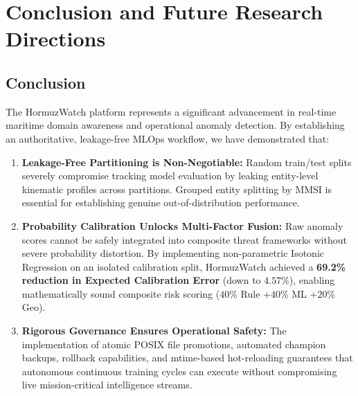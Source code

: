 \section{Conclusion and Future Research Directions}
\label{sec:conclusion}

\subsection{Conclusion}
The HormuzWatch platform represents a significant advancement in real-time maritime domain awareness and operational anomaly detection. By establishing an authoritative, leakage-free MLOps workflow, we have demonstrated that:
\begin{enumerate}[leftmargin=*]
    \item \textbf{Leakage-Free Partitioning is Non-Negotiable:} Random train/test splits severely compromise tracking model evaluation by leaking entity-level kinematic profiles across partitions. Grouped entity splitting by MMSI is essential for establishing genuine out-of-distribution performance.
    \item \textbf{Probability Calibration Unlocks Multi-Factor Fusion:} Raw anomaly scores cannot be safely integrated into composite threat frameworks without severe probability distortion. By implementing non-parametric Isotonic Regression on an isolated calibration split, HormuzWatch achieved a \textbf{69.2\% reduction in Expected Calibration Error} (down to $4.57\%$), enabling mathematically sound composite risk scoring ($40\%$ Rule $+ 40\%$ ML $+ 20\%$ Geo).
    \item \textbf{Rigorous Governance Ensures Operational Safety:} The implementation of atomic POSIX file promotions, automated champion backups, rollback capabilities, and mtime-based hot-reloading guarantees that autonomous continuous training cycles can execute without compromising live mission-critical intelligence streams.
\end{enumerate}

